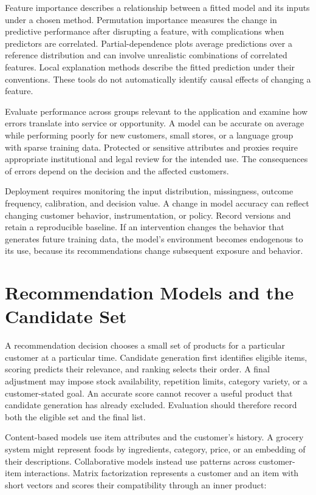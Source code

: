 \noindent Feature importance describes a relationship between a fitted model and
its inputs under a chosen method. Permutation importance measures the
change in predictive performance after disrupting a feature, with
complications when predictors are correlated. Partial-dependence plots
average predictions over a reference distribution and can involve
unrealistic combinations of correlated features. Local explanation
methods describe the fitted prediction under their conventions. These
tools do not automatically identify causal effects of changing a
feature.

Evaluate performance across groups relevant to the application and
examine how errors translate into service or opportunity. A model can be
accurate on average while performing poorly for new customers, small
stores, or a language group with sparse training data. Protected or
sensitive attributes and proxies require appropriate institutional and
legal review for the intended use. The consequences of errors depend on
the decision and the affected customers.

Deployment requires monitoring the input distribution, missingness,
outcome frequency, calibration, and decision value. A change in model
accuracy can reflect changing customer behavior, instrumentation, or
policy. Record versions and retain a reproducible baseline. If an
intervention changes the behavior that generates future training data,
the model's environment becomes endogenous to its use, because its
recommendations change subsequent exposure and behavior.

\hypertarget{M07-recommendation-models-and-the-candidate-set}{%
\section{Recommendation Models and the Candidate
Set}\label{M07-recommendation-models-and-the-candidate-set}}

\noindent A recommendation decision chooses a small set of products for a
particular customer at a particular time. Candidate generation first
identifies eligible items, scoring predicts their relevance, and ranking
selects their order. A final adjustment may impose stock availability,
repetition limits, category variety, or a customer-stated goal. An
accurate score cannot recover a useful product that candidate generation
has already excluded. Evaluation should therefore record both the
eligible set and the final list.

Content-based models use item attributes and the customer's history. A
grocery system might represent foods by ingredients, category, price, or
an embedding of their descriptions. Collaborative models instead use
patterns across customer-item interactions. Matrix factorization
represents a customer and an item with short vectors and scores their
compatibility through an inner product:

